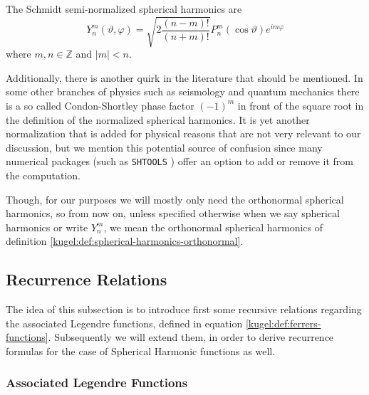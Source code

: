 \begin{definition}
  \label{kugel:def:spherical-harmonics-schmidt}
  The Schmidt semi-normalized spherical harmonics are
  \begin{equation*}
    Y^m_n(\vartheta, \varphi)
    = \sqrt{2 \frac{(n - m)!}{(n + m)!}}
      P^m_n(\cos \vartheta) e^{im\varphi}
  \end{equation*}
  where $m, n \in \mathbb{Z}$ and $|m| < n$.
\end{definition}

Additionally, there is another quirk in the literature that should be mentioned.
In some other branches of physics such as seismology and quantum mechanics there
is a so called Condon-Shortley phase factor $(-1)^m$ in front of the square root
in the definition of the normalized spherical harmonics. It is yet another
normalization that is added for physical reasons that are not very relevant to
our discussion, but we mention this potential source of confusion since many
numerical packages (such as \texttt{SHTOOLS}
\cite{markwieczorek_shtoolsshtools_2022}) offer an option to add or remove it
from the computation.

Though, for our purposes we will mostly only need the orthonormal spherical
harmonics, so from now on, unless specified otherwise when we say spherical
harmonics or write $Y^m_n$, we mean the orthonormal spherical harmonics of
definition \ref{kugel:def:spherical-harmonics-orthonormal}.

\subsection{Recurrence Relations}

The idea of this subsection is to introduce first some recursive relations
regarding the associated Legendre functions, defined in equation
\eqref{kugel:def:ferrers-functions}. Subsequently we will extend them, in order
to derive recurrence formulas for the case of Spherical Harmonic functions as
well.

\subsubsection{Associated Legendre Functions}

